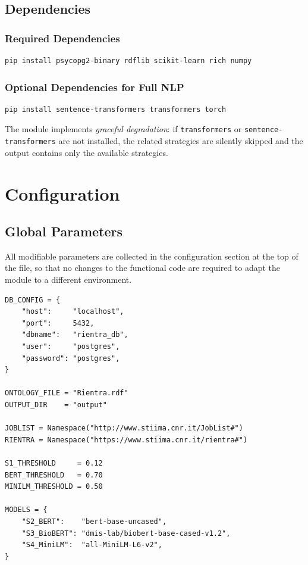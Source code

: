 \documentclass[12pt, a4paper]{report}
\begin{document}
\section{Dependencies}

\subsection{Required Dependencies}

\begin{lstlisting}[caption={Minimum dependencies installation}]
pip install psycopg2-binary rdflib scikit-learn rich numpy
\end{lstlisting}

\subsection{Optional Dependencies for Full NLP}

\begin{lstlisting}[caption={NLP dependencies installation}]
pip install sentence-transformers transformers torch
\end{lstlisting}

\begin{notebox}
The module implements \emph{graceful degradation}: if
\texttt{transformers} or \texttt{sentence-transformers} are not
installed, the related strategies are silently skipped and
the output contains only the available strategies. 
\end{notebox}

% 
\chapter{Configuration}
% 

\section{Global Parameters}

All modifiable parameters are collected in the configuration
section at the top of the file, so that no changes to the
functional code are required to adapt the module to a different environment.

\begin{lstlisting}[caption={Configuration section}]
DB_CONFIG = {
    "host":     "localhost",
    "port":     5432,
    "dbname":   "rientra_db",
    "user":     "postgres",
    "password": "postgres",
}

ONTOLOGY_FILE = "Rientra.rdf"
OUTPUT_DIR    = "output"

JOBLIST = Namespace("http://www.stiima.cnr.it/JobList#")
RIENTRA = Namespace("https://www.stiima.cnr.it/rientra#")

S1_THRESHOLD     = 0.12
BERT_THRESHOLD   = 0.70
MINILM_THRESHOLD = 0.50

MODELS = {
    "S2_BERT":    "bert-base-uncased",
    "S3_BioBERT": "dmis-lab/biobert-base-cased-v1.2",
    "S4_MiniLM":  "all-MiniLM-L6-v2",
}
\end{lstlisting}
\end{document}
